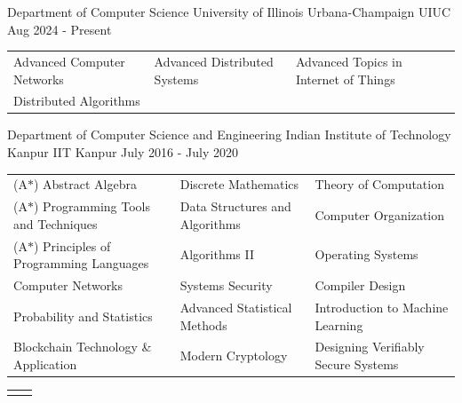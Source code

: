 

\begin{cventries}

\extraentry
  {Department of Computer Science}
  {University of Illinois Urbana-Champaign}
  {UIUC}
  {Aug 2024 - Present}
{\vspace*{-\baselineskip}\fontsize{9.5pt}{1.5em}\bodyfontlight\upshape\color{text}
  \setlength\extrarowheight{-3pt}
  \begin{tabular*}{\textwidth}{L{\textwidth/3} L{\textwidth/3} L{\textwidth/3}}
    Advanced Computer Networks & Advanced Distributed Systems & Advanced Topics in Internet of Things \\
    Distributed Algorithms & \\
\end{tabular*}}


\extraentry
  {Department of Computer Science and Engineering}
  {Indian Institute of Technology Kanpur}
  {IIT Kanpur}
  {July 2016 - July 2020}
{\vspace*{-\baselineskip}\fontsize{9.5pt}{1.5em}\bodyfontlight\upshape\color{text}
  \setlength\extrarowheight{-3pt}
  \begin{tabular*}{\textwidth}{L{\textwidth/3} L{\textwidth/3} L{\textwidth/3}}
    (A$*$) Abstract Algebra & Discrete Mathematics & Theory of Computation \\
    (A$*$) Programming Tools and Techniques & Data Structures and Algorithms & Computer Organization \\
    (A$*$) Principles of Programming Languages & Algorithms II & Operating Systems \\
    Computer Networks & Systems Security & Compiler Design \\
    Probability and Statistics & Advanced Statistical Methods & Introduction to Machine Learning \\
    Blockchain Technology \& Application & Modern Cryptology & Designing Verifiably Secure Systems \\ %
\end{tabular*}}

\end{cventries}

\fontsize{9.5pt}{1em}\footerfont\upshape\color{text}
\begin{tabular*}{\textwidth}{L{\textwidth/3 + 1cm} L{\textwidth/3}}
   &  \\
\end{tabular*}

